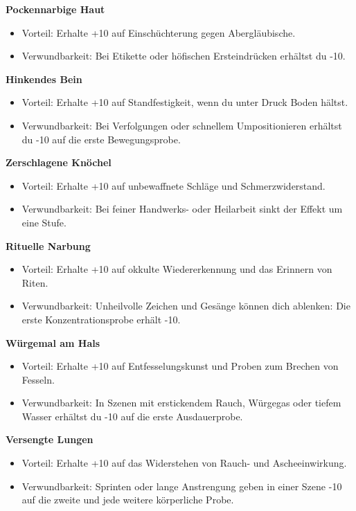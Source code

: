 \noindent\textbf{Pockennarbige Haut}\par
\begin{itemize}[leftmargin=*,nosep]
\item Vorteil: Erhalte +10 auf Einschüchterung gegen Abergläubische.
\item Verwundbarkeit: Bei Etikette oder höfischen Ersteindrücken erhältst du -10.
\end{itemize}
\noindent\textbf{Hinkendes Bein}\par
\begin{itemize}[leftmargin=*,nosep]
\item Vorteil: Erhalte +10 auf Standfestigkeit, wenn du unter Druck Boden hältst.
\item Verwundbarkeit: Bei Verfolgungen oder schnellem Umpositionieren erhältst du -10 auf die erste Bewegungsprobe.
\end{itemize}
\noindent\textbf{Zerschlagene Knöchel}\par
\begin{itemize}[leftmargin=*,nosep]
\item Vorteil: Erhalte +10 auf unbewaffnete Schläge und Schmerzwiderstand.
\item Verwundbarkeit: Bei feiner Handwerks- oder Heilarbeit sinkt der Effekt um eine Stufe.
\end{itemize}
\noindent\textbf{Rituelle Narbung}\par
\begin{itemize}[leftmargin=*,nosep]
\item Vorteil: Erhalte +10 auf okkulte Wiedererkennung und das Erinnern von Riten.
\item Verwundbarkeit: Unheilvolle Zeichen und Gesänge können dich ablenken: Die erste Konzentrationsprobe erhält -10.
\end{itemize}
\noindent\textbf{Würgemal am Hals}\par
\begin{itemize}[leftmargin=*,nosep]
\item Vorteil: Erhalte +10 auf Entfesselungskunst und Proben zum Brechen von Fesseln.
\item Verwundbarkeit: In Szenen mit erstickendem Rauch, Würgegas oder tiefem Wasser erhältst du -10 auf die erste Ausdauerprobe.
\end{itemize}
\noindent\textbf{Versengte Lungen}\par
\begin{itemize}[leftmargin=*,nosep]
\item Vorteil: Erhalte +10 auf das Widerstehen von Rauch- und Ascheeinwirkung.
\item Verwundbarkeit: Sprinten oder lange Anstrengung geben in einer Szene -10 auf die zweite und jede weitere körperliche Probe.
\end{itemize}
